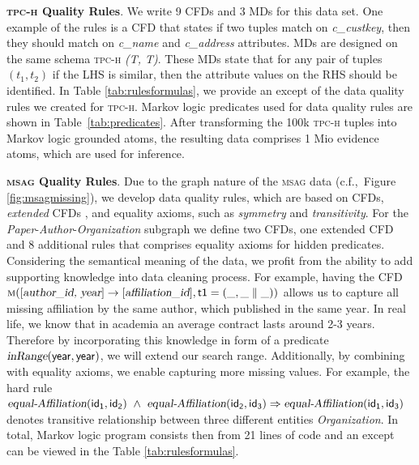 \textbf{\textsc{tpc-h} Quality Rules}. We write 9 CFDs and 3 MDs for this data set. One example of the rules is a CFD that states if two tuples match on \textsl{c\_custkey}, then they should match on \textsl{c\_name} and \textsl{c\_address} attributes. MDs are designed on the same schema \textsc{tpc-h} \textsl{(T, T)}. These MDs state that for any pair of tuples $(t_1,t_2)$ if the LHS is similar, then the attribute values on the RHS should be identified. In Table \ref{tab:rulesformulas}, we provide an except of the data quality rules we created for \textsc{tpc-h}. Markov logic predicates used for data quality rules are shown in Table~\ref{tab:predicates}. After transforming the 100k \textsc{tpc-h} tuples into Markov logic grounded atoms, the resulting data comprises 1 Mio evidence atoms, which are used for inference. 

\textbf{\textsc{msag} Quality Rules}. Due to the graph nature of the \textsc{msag} data (c.f.,~Figure \ref{fig:msagmissing}), we develop data quality rules, which are based on CFDs, \textit{extended} CFDs \cite{Chen2009extended}, and equality axioms, such as \textit{symmetry} and \textit{transitivity}. For the \textit{Paper}-\textit{Author}-\textit{Organization} subgraph we define two CFDs, one extended CFD and 8 additional rules that comprises equality axioms for hidden predicates. Considering the semantical meaning of the data, we profit from the ability to add supporting knowledge into data cleaning process. For example, having the CFD $\mathsf{\textsc{m}([\textsl{author\_id, year}] \rightarrow [\textsl{affiliation\_id}],t1=(\_,\_ \parallel \_))} $  allows us to capture all missing affiliation by the same author, which published in the same year. In real life, we know that in academia an average contract lasts around 2-3 years. Therefore by incorporating this knowledge in form of a predicate $\mathsf{\textsl{inRange}(year, year)}$, we will extend our search range. Additionally, by combining with equality axioms, we enable capturing more missing values. For example, the hard rule $\mathsf{\textsl{equal-Affiliation}(id_1, id_2) ~\wedge~ \textsl{equal-Affiliation}(id_2, id_3) \Rightarrow  \textsl{equal-Affiliation}(id_1, id_3)}$ denotes transitive relationship between three different entities \textit{Organization}. In total, Markov logic program consists then from 21 lines of code and an except can be viewed in the Table \ref{tab:rulesformulas}. 

